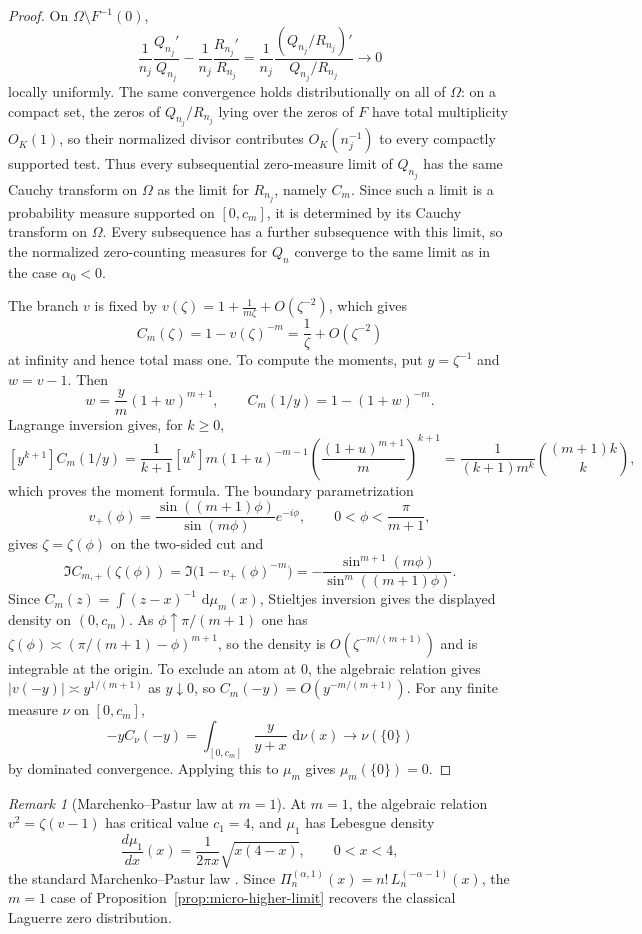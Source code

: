 \documentclass[reqno]{article}
\theoremstyle{definition}
\theoremstyle{remark}
\newtheorem{remark}[theorem]{Remark}
\theoremstyle{plain}
\newcommand{\dd}{\,\mathrm d}
\begin{document}
\begin{proof}
On $\Omega\setminus F^{-1}(0)$,
$$
\frac1{n_j}\frac{Q_{n_j}'}{Q_{n_j}}-\frac1{n_j}\frac{R_{n_j}'}{R_{n_j}}
=\frac1{n_j}\frac{(Q_{n_j}/R_{n_j})'}{Q_{n_j}/R_{n_j}}\longrightarrow0
$$
locally uniformly. The same convergence holds distributionally on all of $\Omega$: on a compact set, the zeros of $Q_{n_j}/R_{n_j}$ lying over the zeros of $F$ have total multiplicity $O_K(1)$, so their normalized divisor contributes $O_K(n_j^{-1})$ to every compactly supported test. Thus every subsequential zero-measure limit of $Q_{n_j}$ has the same Cauchy transform on $\Omega$ as the limit for $R_{n_j}$, namely $C_m$. Since such a limit is a probability measure supported on $[0,c_m]$, it is determined by its Cauchy transform on $\Omega$. Every subsequence has a further subsequence with this limit, so the normalized zero-counting measures for $Q_n$ converge to the same limit as in the case $\alpha_0<0$.

The branch $v$ is fixed by $v(\zeta)=1+\frac1{m\zeta}+O(\zeta^{-2})$, which gives
$$C_m(\zeta)=1-v(\zeta)^{-m}=\frac1\zeta+O(\zeta^{-2})$$
at infinity and hence total mass one. To compute the moments, put $y=\zeta^{-1}$ and $w=v-1$. Then
$$w=\frac{y}{m}(1+w)^{m+1},\qquad C_m(1/y)=1-(1+w)^{-m}.$$
Lagrange inversion gives, for $k\ge0$,
$$[y^{k+1}]C_m(1/y)=\frac{1}{k+1}[u^k]m(1+u)^{-m-1}\left(\frac{(1+u)^{m+1}}{m}\right)^{k+1}
=\frac{1}{(k+1)m^k}\binom{(m+1)k}{k},$$
which proves the moment formula. The boundary parametrization
$$v_+(\phi)=\frac{\sin((m+1)\phi)}{\sin(m\phi)}e^{-i\phi},\qquad 0<\phi<\frac{\pi}{m+1},$$
gives $\zeta=\zeta(\phi)$ on the two-sided cut and
$$
\Im C_{m,+}(\zeta(\phi))
=\Im\bigl(1-v_+(\phi)^{-m}\bigr)
=-\frac{\sin^{m+1}(m\phi)}{\sin^m((m+1)\phi)}.
$$
Since $C_m(z)=\int(z-x)^{-1}\,\dd\mu_m(x)$, Stieltjes inversion gives the displayed density on $(0,c_m)$. As $\phi\uparrow\pi/(m+1)$ one has $\zeta(\phi)\asymp(\pi/(m+1)-\phi)^{m+1}$, so the density is $O(\zeta^{-m/(m+1)})$ and is integrable at the origin. To exclude an atom at $0$, the algebraic relation gives $|v(-y)|\asymp y^{1/(m+1)}$ as $y\downarrow0$, so $C_m(-y)=O(y^{-m/(m+1)})$. For any finite measure $\nu$ on $[0,c_m]$,
$$
-yC_\nu(-y)=\int_{[0,c_m]}\frac{y}{y+x}\,\dd\nu(x)\longrightarrow\nu(\{0\})
$$
by dominated convergence. Applying this to $\mu_m$ gives $\mu_m(\{0\})=0$.
\end{proof}

\begin{remark}[Marchenko--Pastur law at $m=1$]\label{rem:mp-from-sheffer}
At $m=1$, the algebraic relation $v^2=\zeta(v-1)$ has critical value $c_1=4$, and $\mu_1$ has Lebesgue density
$$\frac{d\mu_1}{dx}(x)=\frac{1}{2\pi x}\sqrt{x(4-x)},\qquad 0<x<4,$$
the standard Marchenko--Pastur law \cite{MP}. Since $\Pi_n^{(\alpha,1)}(x)=n!\,L_n^{(-\alpha-1)}(x)$, the $m=1$ case of Proposition~\ref{prop:micro-higher-limit} recovers the classical Laguerre zero distribution.
\end{remark}
\end{document}
